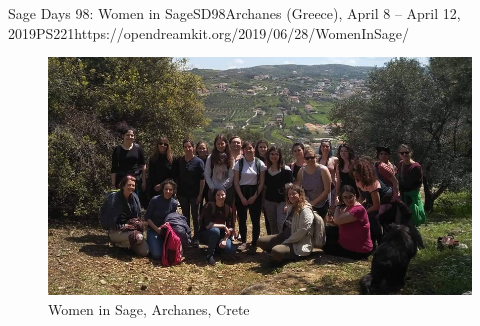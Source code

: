 \begin{event}{Sage Days 98: Women in Sage}{SD98}{Archanes (Greece), April 8 -- April 12, 2019}{PS}{22}{1}{https://opendreamkit.org/2019/06/28/WomenInSage/}
\begin{figure}[ht]
  \includegraphics[width=.75\textwidth]{group_photo_head.jpeg}
  \caption*{Women in Sage, Archanes, Crete}
\end{figure}



\end{event}
